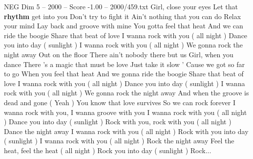 \begin{textsample}{NEG Dim 5 – 2000 – Score -1.00 – 2000/459.txt}  \label{ex:f5_neg_040}
Girl, close your eyes Let that \textbf{rhythm} get into you Don't try to fight it Ain't nothing that you can do Relax your mind Lay back and groove with mine You gotta feel that heat And we can ride the boogie Share that beat of love I wanna rock with you ( all night ) Dance you into day ( sunlight ) I wanna rock with you ( all night ) We gonna rock the night away Out on the floor There ain't nobody there but us Girl, when you dance There 's a magic that must be love Just take it slow ' Cause we got so far to go When you feel that heat And we gonna ride the boogie Share that beat of love I wanna rock with you ( all night ) Dance you into day ( sunlight ) I wanna rock with you ( all night ) We gonna rock the night away And when the groove is dead and gone ( Yeah ) You know that love survives So we can rock forever I wanna rock with you, I wanna groove with you I wanna rock with you ( all night ) Dance you into day ( sunlight ) Rock with you, rock with you ( all night ) Dance the night away I wanna rock with you ( all night ) Rock with you into day ( sunlight ) I wanna rock with you ( all night ) Rock the night away Feel the heat, feel the heat ( all night ) Rock you into day ( sunlight ) Rock...

\end{textsample}
